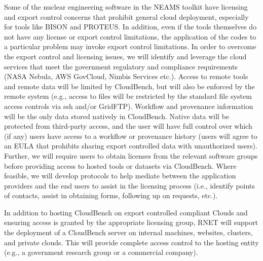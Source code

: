 Some of the nuclear engineering software in the NEAMS toolkit have
licensing and export control concerns that prohibit general cloud deployment, especially
for tools like BISON and PROTEUS. In addition, even if the tools
themselves do not have any license or export control limitations, the application
of the codes to a particular problem may invoke export control
limitations. In order to overcome the export control and licensing
issues, we will identify and leverage the cloud services that meet the
government regulatory and compliance requirements (NASA Nebula, AWS
GovCloud, Nimbis Services etc.). Access to remote tools and remote data will be limited by CloudBench, but will also be enforced by the remote system (e.g., access to files will be restricted by the standard file system access controls via ssh and/or GridFTP). Workflow and provenance information will be the only data stored natively in CloudBench. Native data will be protected from third-party access, and the user will have full control over which (if any) users have access to a workflow or provenance history (users will agree to an EULA that prohibits sharing export controlled data with unauthorized users). Further, we will require users to
obtain licenses from the relevant software groups before providing
access to hosted tools or datasets via CloudBench. Where feasible, we
will develop protocols to help mediate between the application providers and the
end users to assist in the licensing process (i.e., identify points of contacts, assist in obtaining
forms, following up on requests, etc.).

In addition to hosting CloudBench on export controlled compliant Clouds
and ensuring access is granted by the appropriate licensing group,
RNET will support the deployment of a CloudBench server on internal
machines, websites, clusters, and private clouds. This will provide
complete access control to the hosting entity (e.g., a government
research group or a commercial company).



